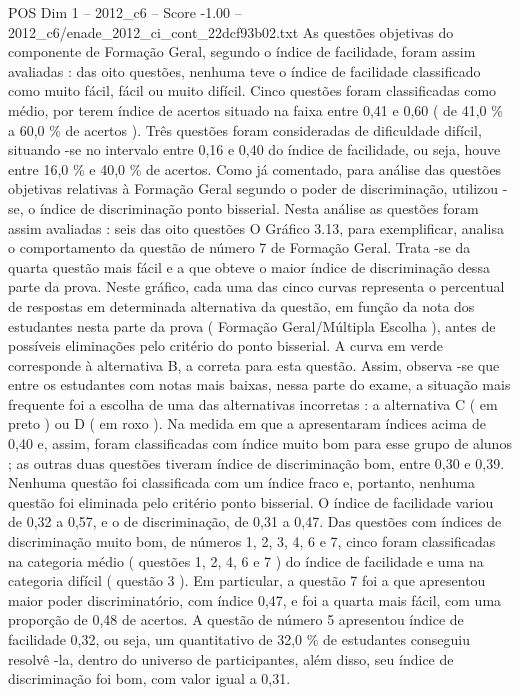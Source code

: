 \begin{textsample}{POS Dim 1 – 2012\_c6 – Score -1.00 – 2012\_c6/enade\_2012\_ci\_cont\_22dcf93b02.txt}
As questões objetivas do componente de Formação Geral, segundo o índice de facilidade, foram assim avaliadas : das oito questões, nenhuma teve o índice de facilidade classificado como muito fácil, fácil ou muito difícil.
Cinco questões foram classificadas como médio, por terem índice de acertos situado na faixa entre 0,41 e 0,60 ( de 41,0 \% a 60,0 \% de acertos ).
Três questões foram consideradas de dificuldade difícil, situando -se no intervalo entre 0,16 e 0,40 do índice de facilidade, ou seja, houve entre 16,0 \% e 40,0 \% de acertos.
Como já comentado, para análise das questões objetivas relativas à Formação Geral segundo o poder de discriminação, utilizou -se, o índice de discriminação ponto bisserial.
Nesta análise as questões foram assim avaliadas : seis das oito questões O Gráfico 3.13, para exemplificar, analisa o comportamento da questão de número 7 de Formação Geral.
Trata -se da quarta questão mais fácil e a que obteve o maior índice de discriminação dessa parte da prova.
Neste gráfico, cada uma das cinco curvas representa o percentual de respostas em determinada alternativa da questão, em função da nota dos estudantes nesta parte da prova ( Formação Geral/Múltipla Escolha ), antes de possíveis eliminações pelo critério do ponto bisserial.
A curva em verde corresponde à alternativa B, a correta para esta questão.
Assim, observa -se que entre os estudantes com notas mais baixas, nessa parte do exame, a situação mais frequente foi a escolha de uma das alternativas incorretas : a alternativa C ( em preto ) ou D ( em roxo ).
Na medida em que a apresentaram índices acima de 0,40 e, assim, foram classificadas com índice muito bom para esse grupo de alunos ; as outras duas questões tiveram índice de discriminação bom, entre 0,30 e 0,39.
Nenhuma questão foi classificada com um índice fraco e, portanto, nenhuma questão foi eliminada pelo critério ponto bisserial.
O índice de facilidade variou de 0,32 a 0,57, e o de discriminação, de 0,31 a 0,47.
Das questões com índices de discriminação muito bom, de números 1, 2, 3, 4, 6 e 7, cinco foram classificadas na categoria médio ( questões 1, 2, 4, 6 e 7 ) do índice de facilidade e uma na categoria difícil ( questão 3 ).
Em particular, a questão 7 foi a que apresentou maior poder discriminatório, com índice 0,47, e foi a quarta mais fácil, com uma proporção de 0,48 de acertos.
A questão de número 5 apresentou índice de facilidade 0,32, ou seja, um quantitativo de 32,0 \% de estudantes conseguiu resolvê -la, dentro do universo de participantes, além disso, seu índice de discriminação foi bom, com valor igual a 0,31.

\end{textsample}
